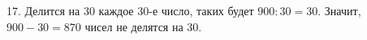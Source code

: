 17. Делится на 30 каждое 30-е число, таких будет $900:30=30.$ Значит, $900-30=870$ чисел не делятся на 30.\\
